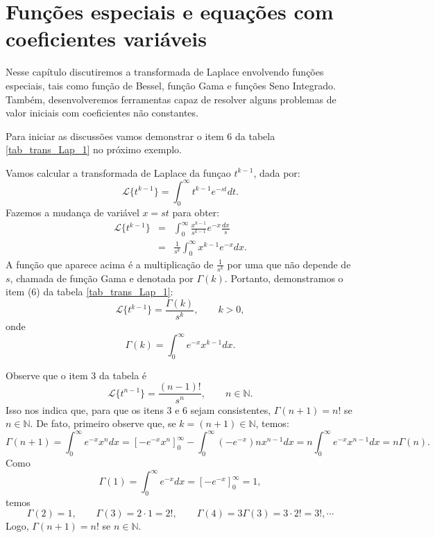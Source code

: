 
%


\chapter{Funções especiais e equações com coeficientes variáveis}

Nesse capítulo discutiremos a transformada de Laplace envolvendo funções especiais, tais como função de Bessel, função Gama e funções Seno Integrado. Também, desenvolveremos ferramentas capaz de resolver alguns problemas de valor iniciais com coeficientes não constantes.

Para iniciar as discussões vamos demonstrar o item 6 da tabela \ref{tab_trans_Lap_1} no próximo exemplo.

\begin{ex}Vamos calcular a transformada de Laplace da funçao $t^{k-1}$, dada por:
$$
\mathcal{L}\{t^{k-1} \}=\int_0^\infty t^{k-1} e^{-st}dt.
$$
Fazemos a mudança de variável $x=st$ para obter:
\begin{eqnarray*}
 \mathcal{L}\{t^{k-1} \}&=&\int_0^\infty \frac{x^{k-1}}{s^{k-1}}e^{-x}\frac{dx}{s}\\
 &=&\frac{1}{s^k}\int_0^\infty x^{k-1}e^{-x} dx.
 \end{eqnarray*}
A função que aparece acima é a multiplicação de $\frac{1}{s^k}$ por uma que não depende de $s$, chamada de função Gama e denotada por $\Gamma(k)$. Portanto, demonstramos o item (6) da tabela \ref{tab_trans_Lap_1}:
$$
\mathcal{L}\{t^{k-1} \}=\frac{\Gamma(k)}{s^k},\qquad k>0,
$$
onde
$$
\Gamma(k)=\int_0^\infty e^{-x}x^{k-1}dx.
$$
\end{ex}
Observe que o item 3 da tabela é
$$
\mathcal{L}\{t^{n-1}\}=\frac{(n-1)!}{s^n}, \qquad n\in \mathbb{N}.
$$
Isso nos indica que, para que os itens 3 e 6 sejam consistentes, $\Gamma(n+1)=n!$ se $n\in\mathbb{N}$. De fato, primeiro observe que, se $k=(n+1)\in\mathbb{N}$, temos:
$$
\Gamma(n+1)=\int_0^\infty e^{-x}x^{n}dx=\left[-e^{-x}x^{n}\right]_0^\infty-\int_0^\infty (-e^{-x})nx^{n-1}dx=n\int_0^\infty e^{-x}x^{n-1}dx=n\Gamma(n).
$$
Como 
$$
\Gamma(1)=\int_0^\infty e^{-x}dx=\left[-e^{-x}\right]_0^\infty=1,
$$
temos
$$
\Gamma(2)=1,\qquad \Gamma(3)=2\cdot 1=2!,\qquad \Gamma(4)=3\Gamma(3)=3\cdot 2!=3!,\cdots
$$
Logo, $\Gamma(n+1)=n!$ se $n\in\mathbb{N}$.

